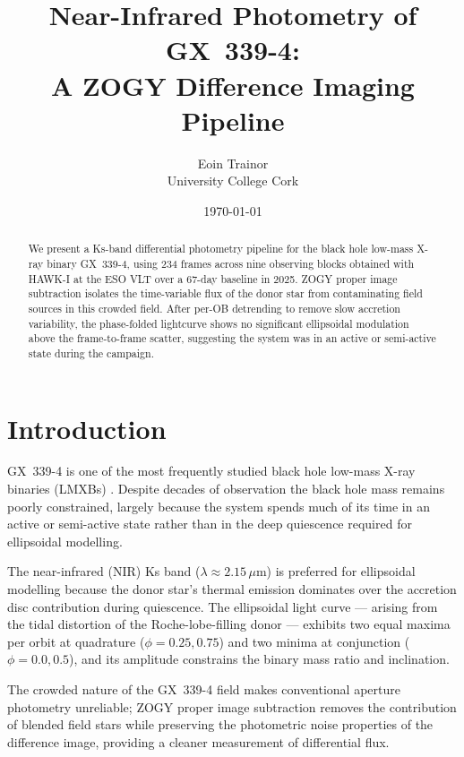 \documentclass[12pt,a4paper]{article}
\title{Near-Infrared Photometry of GX~339-4:\\
       {\small A ZOGY Difference Imaging Pipeline}}
\author{Eoin Trainor \\ University College Cork}
\date{\today}
\begin{document}
\maketitle

\begin{abstract}
We present a Ks-band differential photometry pipeline for the black hole
low-mass X-ray binary GX~339-4, using 234 frames across nine observing
blocks obtained with HAWK-I at the ESO VLT over a 67-day baseline in
2025.  ZOGY proper image subtraction isolates the time-variable flux of
the donor star from contaminating field sources in this crowded field.
After per-OB detrending to remove slow accretion variability, the
phase-folded lightcurve shows no significant ellipsoidal modulation above
the frame-to-frame scatter, suggesting the system was in an active or
semi-active state during the campaign.
\end{abstract}

\tableofcontents
\newpage

\section{Introduction}
\label{sec:intro}

GX~339-4 is one of the most frequently studied black hole low-mass
X-ray binaries (LMXBs) \cite{Markert1973}.  Despite decades of
observation the black hole mass remains poorly constrained, largely
because the system spends much of its time in an active or
semi-active state rather than in the deep quiescence required for
ellipsoidal modelling.

The near-infrared (NIR) Ks band ($\lambda \approx 2.15\,\mu$m) is
preferred for ellipsoidal modelling because the donor star's
thermal emission dominates over the accretion disc contribution
during quiescence.  The ellipsoidal light curve — arising from the
tidal distortion of the Roche-lobe-filling donor — exhibits two
equal maxima per orbit at quadrature ($\phi = 0.25, 0.75$) and two
minima at conjunction ($\phi = 0.0, 0.5$), and its amplitude
constrains the binary mass ratio and inclination.

The crowded nature of the GX~339-4 field makes conventional aperture
photometry unreliable; ZOGY proper image subtraction
\cite{Zackay2016} removes the contribution of blended field stars
while preserving the photometric noise properties of the difference
image, providing a cleaner measurement of differential flux.
\end{document}
